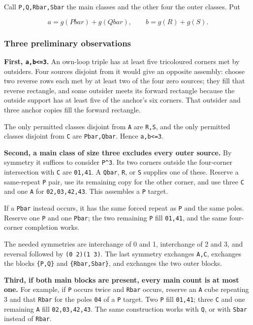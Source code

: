 \documentclass[
  10pt,
]{article}
\begin{document}
Call \texttt{P,Q,Rbar,Sbar} the main classes and the other four the
outer classes. Put

\[
a=g(Pbar)+g(Qbar),\qquad b=g(R)+g(S).
\]

\hypertarget{three-preliminary-observations}{%
\subsubsection*{Three preliminary
observations}\label{three-preliminary-observations}}

\textbf{First, \texttt{a,b\textless{}=3}.} An own-loop triple has at
least five tricoloured corners met by outsiders. Four sources disjoint
from it would give an opposite assembly: choose two reverse rows each
met by at least two of the four zero sources; they fill that reverse
rectangle, and some outsider meets its forward rectangle because the
outside support has at least five of the anchor's six corners. That
outsider and three anchor copies fill the forward rectangle.

The only permitted classes disjoint from \texttt{A} are \texttt{R,S},
and the only permitted classes disjoint from \texttt{C} are
\texttt{Pbar,Qbar}. Hence \texttt{a,b\textless{}=3}.

\textbf{Second, a main class of size three excludes every outer source.}
By symmetry it suffices to consider \texttt{P\^{}3}. Its two corners
outside the four-corner intersection with \texttt{C} are \texttt{01,41}.
A \texttt{Qbar}, \texttt{R}, or \texttt{S} supplies one of these.
Reserve a same-repeat \texttt{P} pair, use its remaining copy for the
other corner, and use three \texttt{C} and one \texttt{A} for
\texttt{02,03,42,43}. This assembles a \texttt{P} target.

If a \texttt{Pbar} instead occurs, it has the same forced repeat as
\texttt{P} and the same poles. Reserve one \texttt{P} and one
\texttt{Pbar}; the two remaining \texttt{P} fill \texttt{01,41}, and the
same four-corner completion works.

The needed symmetries are interchange of 0 and 1, interchange of 2 and
3, and reversal followed by \texttt{(0\ 2)(1\ 3)}. The last symmetry
exchanges \texttt{A,C}, exchanges the blocks \texttt{\{P,Q\}} and
\texttt{\{Rbar,Sbar\}}, and exchanges the two outer blocks.

\textbf{Third, if both main blocks are present, every main count is at
most one.} For example, if \texttt{P} occurs twice and \texttt{Rbar}
occurs, reserve an \texttt{A} cube repeating 3 and that \texttt{Rbar}
for the poles \texttt{04} of a \texttt{P} target. Two \texttt{P} fill
\texttt{01,41}; three \texttt{C} and one remaining \texttt{A} fill
\texttt{02,03,42,43}. The same construction works with \texttt{Q}, or
with \texttt{Sbar} instead of \texttt{Rbar}.
\end{document}
